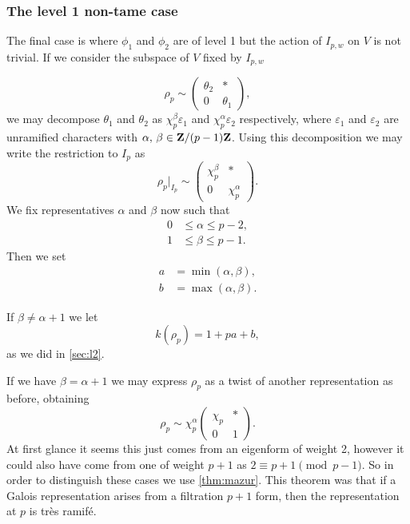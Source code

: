 \documentclass[a4paper,12pt]{article}
\begin{document}
\subsubsection{The level 1 non-tame case}\label{sec:l1nt}
The final case is where $\phi_1$ and $\phi_2$ are of level 1 but the action of $I_{p,w}$ on $V$ is not trivial.
If we consider the subspace of $V$ fixed by $I_{p,w}$ %

\[
\rho_p \sim \begin{pmatrix}
\theta_2 & * \\
0        & \theta_1 \end{pmatrix},
\]
we may decompose $\theta_1$ and $\theta_2$ as $\chi_p^\beta \varepsilon_1$ and $\chi_p^\alpha \varepsilon_2$ respectively, where $\varepsilon_1$ and $\varepsilon_2$ are unramified characters with $\alpha,\,\beta \in \mathbf{Z}/(p-1)\mathbf{Z}$.
Using this decomposition we may write the restriction to $I_p$ as
\[
\rho_p|_{I_p} \sim \begin{pmatrix}
\chi_p^\beta & * \\
0          & \chi_p^\alpha \end{pmatrix}.
\]
We fix representatives $\alpha$ and $\beta$ now such that
\begin{align*}
0&\le \alpha \le p - 2,\\
1&\le \beta \le p - 1.
\end{align*}
Then we set
\begin{align*}
a &= \min(\alpha, \beta),\\
b &= \max(\alpha, \beta).
\end{align*}

If $\beta \ne \alpha + 1$ we let
\begin{equation}\label{eq:l1nt}
k(\rho_p) = 1 + pa + b,
\end{equation}
as we did in \cref{sec:l2}.

If we have $\beta = \alpha + 1$ we may express $\rho_p$ as a twist of another representation as before, obtaining %
\[
\rho_p \sim \chi_p^\alpha \begin{pmatrix}
\chi_p & * \\
0        & 1 \end{pmatrix}.
\] %
At first glance it seems this just comes from an eigenform of weight 2, however it could also have come from one of weight $p + 1$ as $2 \equiv p+1 \pmod{p-1}$.
So in order to distinguish these cases we use \cref{thm:mazur}.
This theorem was that if a Galois representation arises from a filtration $p+1$ form, then the representation at $p$ is tr\`es ramif\'e.
\end{document}
